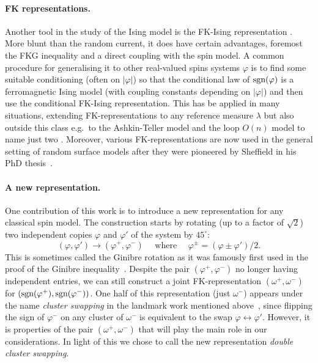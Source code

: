 \documentclass{article}
\numberwithin{equation}{section}
\theoremstyle{definition}
\theoremstyle{definition}
\theoremstyle{remark}
\DeclareMathOperator{\sgn}{\textnormal{sgn}}
\newcommand\vp{\varphi}
\newcommand{\w}{\omega}
\begin{document}
\paragraph{FK representations. }Another tool in the study of the Ising model is the FK-Ising representation \cite{FK}. More blunt than the random current, it does have certain advantages, foremost the FKG inequality \cite{FKG} and a direct coupling with the spin model. 
A common procedure for generalising it to other real-valued spins systems $\vp$ is to find some suitable conditioning (often on $|\vp|$) so that the conditional law of $\sgn(\vp)$ is a ferromagnetic Ising model (with coupling constants depending on $|\vp|$) and then use the conditional FK-Ising representation. This has be applied in many situations, extending FK-representations to any reference measure $\lambda$ but also outside this class e.g.~to the Ashkin-Teller model and the loop $O(n)$ model to name just two \cite{PfiVel,GlaPel,Lis22a,glazman2025planar}. Moreover, various FK-representations are now used in the general setting of random surface models \cite{Lammers,lammers2022dichotomy,Lis20,Lis22b,glazman2025delocalisation} after they were pioneered by Sheffield in his PhD thesis~\cite{She}.  

\paragraph{A new representation.}One contribution of this work is to introduce a new representation for any classical spin model. 
The construction starts by rotating (up to a factor of $\sqrt 2$) two independent copies $\vp$ and $\vp'$ of the system by $45^\circ$:
\[
	(\vp,\vp') \longrightarrow (\vp^+,\vp^-) \quad \text{ where } \quad \vp^\pm = \left( \vp \pm \vp' \right) / 2.
\]
This is sometimes called the Ginibre rotation as it was famously first used in the proof of the Ginibre inequality~\cite{Gin}.
Despite the pair $(\vp^+,\vp^-)$ no longer having independent entries, we can still construct a joint FK-representation $(\w^+,\w^-)$ for $ (\sgn(\vp^+),\sgn(\vp^-))$. One half of this representation (just $\w^-$) appears under the name \emph{cluster swapping} in the landmark work mentioned above~\cite{She}, since flipping the sign of $\vp^-$ on any cluster of $\w^-$ is equivalent to the swap $\vp \leftrightarrow \vp'$. However, it is properties of the pair $(\w^+,\w^-)$ that will play the main role in our considerations. 
In light of this we chose to call the new representation \emph{double cluster swapping}.
\end{document}

